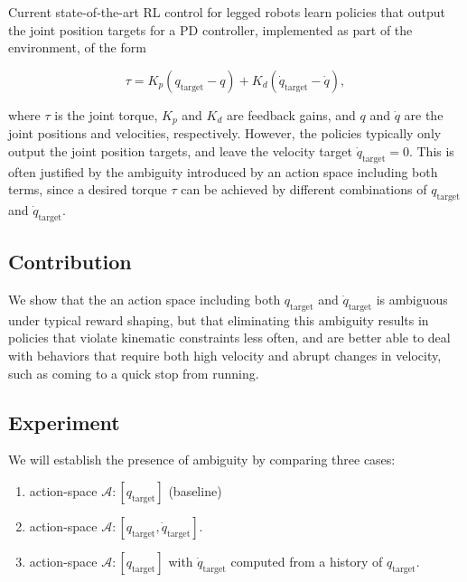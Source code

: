 \documentclass[
  11pt,
  letterpaper,
]{article}
\providecommand{\tightlist}{%
  \setlength{\itemsep}{0pt}\setlength{\parskip}{0pt}}
\begin{document}
Current state-of-the-art RL control for legged robots learn policies
that output the joint position targets for a PD controller, implemented
as part of the environment, of the form

\begin{equation*}
\tau = K_p (q_{\text{target}} - q) + K_d (\dot{q}_{\text{target}} - \dot{q}),
\end{equation*}

where $\tau$ is the joint torque, $K_p$ and $K_d$ are feedback
gains, and $q$ and $\dot{q}$ are the joint positions and velocities,
respectively. However, the policies typically only output the joint
position targets, and leave the velocity target
$\dot{q}_{\text{target}} = 0$. This is often justified by the
ambiguity introduced by an action space including both terms, since a
desired torque $\tau$ can be achieved by different combinations of
$q_{\text{target}}$ and $\dot{q}_{\text{target}}$.

\subsection{Contribution}\label{contribution}

We show that the an action space including both $q_{\text{target}}$
and $\dot{q}_{\text{target}}$ is ambiguous under typical reward
shaping, but that eliminating this ambiguity results in policies that
violate kinematic constraints less often, and are better able to deal
with behaviors that require both high velocity and abrupt changes in
velocity, such as coming to a quick stop from running.

\subsection{Experiment}\label{experiment}

We will establish the presence of ambiguity by comparing three cases:

\begin{enumerate}
\def\labelenumi{\arabic{enumi}.}
\tightlist
\item
  action-space $\mathcal{A}: [q_{\text{target}}]$ (baseline)
\item
  action-space
  $\mathcal{A}: [q_{\text{target}}, \dot{q}_{\text{target}}]$.
\item
  action-space $\mathcal{A}: [q_{\text{target}}]$ with
  $\dot{q}_{\text{target}}$ computed from a history of
  $q_{\text{target}}$.
\end{enumerate}
\end{document}
